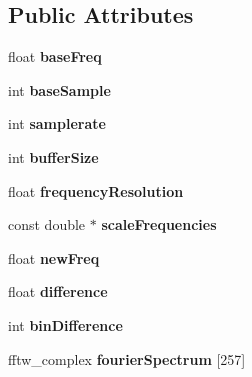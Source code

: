 \subsection*{Public Attributes}
\begin{DoxyCompactItemize}
\item 
\hypertarget{classVocoder_a47e8c37097fafbe8bd8a87adba84e5f1}{float {\bfseries base\-Freq}}\label{classVocoder_a47e8c37097fafbe8bd8a87adba84e5f1}

\item 
\hypertarget{classVocoder_ad4f1e12813090bb2a980be7aa3bac471}{int {\bfseries base\-Sample}}\label{classVocoder_ad4f1e12813090bb2a980be7aa3bac471}

\item 
\hypertarget{classVocoder_a7fa47ae2edf71aeb5b36e875bb440667}{int {\bfseries samplerate}}\label{classVocoder_a7fa47ae2edf71aeb5b36e875bb440667}

\item 
\hypertarget{classVocoder_a38c9aa4fad739f7577e51fc3d4891751}{int {\bfseries buffer\-Size}}\label{classVocoder_a38c9aa4fad739f7577e51fc3d4891751}

\item 
\hypertarget{classVocoder_a5bd2da8b9a6b618be7828035dfb50f53}{float {\bfseries frequency\-Resolution}}\label{classVocoder_a5bd2da8b9a6b618be7828035dfb50f53}

\item 
\hypertarget{classVocoder_a2cf377a9138da30b22b273f55915ea65}{const double $\ast$ {\bfseries scale\-Frequencies}}\label{classVocoder_a2cf377a9138da30b22b273f55915ea65}

\item 
\hypertarget{classVocoder_a77dcc19311b4905125bf609084b4ad2a}{float {\bfseries new\-Freq}}\label{classVocoder_a77dcc19311b4905125bf609084b4ad2a}

\item 
\hypertarget{classVocoder_a300f616506453a971cf21a7de35e2964}{float {\bfseries difference}}\label{classVocoder_a300f616506453a971cf21a7de35e2964}

\item 
\hypertarget{classVocoder_acd33a5938c9167429b2a4cd8c58374ae}{int {\bfseries bin\-Difference}}\label{classVocoder_acd33a5938c9167429b2a4cd8c58374ae}

\item 
\hypertarget{classVocoder_a2884b2fe7d5303609ddeff6979bdbcd3}{fftw\-\_\-complex {\bfseries fourier\-Spectrum} \mbox{[}257\mbox{]}}\label{classVocoder_a2884b2fe7d5303609ddeff6979bdbcd3}


\end{DoxyCompactItemize}
